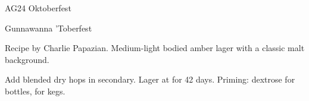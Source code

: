 \begin{recipe}{AG24 Oktoberfest}
\begin{recipe}{Gunnawanna 'Toberfest}
\begin{aboutblock}
Recipe by Charlie Papazian. Medium-light bodied amber lager with a classic malt
background. 
\end{aboutblock}


\begin{methodandtiming}

\begin{mashsteps}
\end{mashsteps}

\begin{fermentationsteps}
\end{fermentationsteps}

\begin{directions}
Add blended dry hops in secondary. Lager at  for 42 days. Priming: 
dextrose for bottles,  for kegs. 
\end{directions}

\end{methodandtiming}

\recipebreak

\begin{ingredientsblock}

\begin{malts}
\end{malts}

\begin{hops}
\end{hops}


\end{ingredientsblock}

\end{recipe}


\end{recipe}
